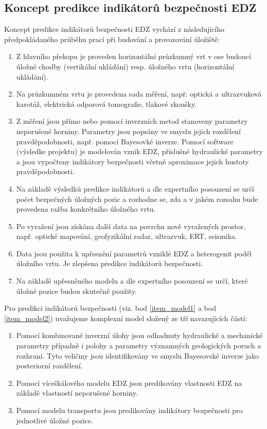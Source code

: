 \documentclass{article}
\begin{document}
\subsection{Koncept predikce indikátorů bezpečnosti EDZ}



Koncept predikce indikátorů bezpečnosti EDZ vychází z následujícího předpokládaného průběhu prací 
při budování a provozování úložiště:
\begin{enumerate}
    \item Z hlavního překopu je proveden horizontální průzkumný vrt v ose budoucí úložné chodby
        (vertikální ukládání) resp. úložného vrtu (horizontální ukládání).
    \item Na průzkumném vrtu je provedena sada měření, 
          např: optická a ultrazvuková karotáž, elektrická odporová tomografie, tlakové zkoušky.

    \item \label{item_model1}
        Z měření jsou přímo nebo pomocí inverzních metod stanoveny parametry neporušené horniny.
        Parametry jsou popsány ve smyslu jejich rozdělení pravděpodobnosti, 
        např. pomocí Bayesovké inverze. Pomocí software (výsledke projektu) je modelován vznik EDZ,
        příslušné hydraulické parametry a jsou vypočteny indikátory bezpečnosti včetně aproximace 
        jejich hustoty pravděpodobnosti.
    \item Na základě výsledků predikce indikátorů a dle expertního posouzení se určí počet bezpečných
        úložných pozic a rozhodne se, zda a v jakém rozsahu bude provedena ražba  konkrétního úložného vrtu.
    \item Po vyražení jsou získána další data na povrchu nově vyražených prostor, např. optické mapování, 
        geofyzikální radar, ultrazvuk, ERT, seismika. 
    \item Data jsou použita k upřesnění parametrů vzniklé EDZ a heterogenit podél úložního vrtu. 
        Je zlepšena predikce indikátorů bezpečnosti.  
    \item \label{item_model2}
        Na základě upřesněného modelu a dle expertního posouzení se určí, které úložné pozice budou 
        skutečně použity.
\end{enumerate}


Pro predikci indikátorů bezpečnosti (viz. bod \ref{item_model1} 
a bod \ref{item_model2}) uvažujeme komplexní model složený ze tří navazujících částí: 
    \begin{enumerate}
    \item Pomocí kombinované inverzní úlohy jsou odhadnuty hydraulické a mechanické
     parametry  případně i polohy a parametry významných geologických poruch a rozhraní. 
     Tyto veličiny jsou identifikovány ve smyslu Bayesovské inverze jako posteriorní rozdělení.
    \item Pomocí víceškálového modelu EDZ jsou predikovány vlastnosti EDZ na základě vlastností neporušené horniny.
    \item Pomocí modelu transportu jsou predikovány indikátory bezpečnosti pro jednotlivé úložné pozice.
    \end{enumerate}
\end{document}
